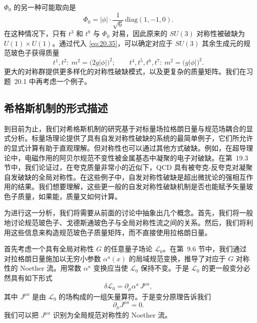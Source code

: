 $\Phi_0$ 的另一种可能取向是
\begin{equation}
  \Phi_0 = |\phi|\cdot\frac{1}{\sqrt{6}}\,
    \mathrm{diag}(1, -1, 0) .
  \label{eq:20.41}
\end{equation}
在这种情况下，只有 $t^3$ 和 $t^8$ 与 $\Phi_0$ 对易，因此原来的 $SU(3)$ 对称性被破缺为 $U(1)\times U(1)$。通过代入 \eqref{eq:20.35}，可以确定对应于 $SU(3)$ 其余生成元的规范玻色子获得质量
\begin{equation}
  t^1, t^2:\ m^2 = \bigl( 2g|\phi| \bigr)^2;\qquad
  t^4, t^5, t^6, t^7:\ m^2 = \bigl( g|\phi| \bigr)^2 .
  \label{eq:20.42}
\end{equation}
更大的对称群提供更多样化的对称性破缺模式，以及更复杂的质量矩阵。我们在习题~20.1 中再考虑一个例子。

\subsection{希格斯机制的形式描述}

到目前为止，我们对希格斯机制的研究基于对标量场拉格朗日量与规范场耦合的显式分析。标量场理论提供了具有自发对称性破缺的系统的最简单例子，它们所允许的显式计算有助于直观理解。但对称性也可以通过其他方式破缺。例如，在超导理论中，电磁作用的阿贝尔规范不变性被金属基态中凝聚的电子对破缺。在第~19.3 节中，我们论证过，在夸克质量非常小的近似下，QCD 具有被夸克-反夸克对凝聚自发破缺的全局对称性。在这些例子中，自发对称性破缺是超出微扰论的强相互作用的结果。我们想要理解，这些更一般的自发对称性破缺机制是否也能赋予矢量玻色子质量，如果能，质量又如何计算。

为进行这一分析，我们将需要从前面的讨论中抽象出几个概念。首先，我们将一般地讨论规范玻色子、戈德斯通玻色子与全局对称性流之间的关系。然后，我们将利用这些信息来构造规范玻色子质量矩阵，而不直接使用拉格朗日量。

首先考虑一个具有全局对称性 $G$ 的任意量子场论 $\mathcal{L}_0$。在第~9.6 节中，我们通过对拉格朗日量施加以无穷小参数 $\alpha^a(x)$ 的局域规范变换，推导了对应于 $G$ 对称性的 Noether 流。用常数 $\alpha^a$ 变换应当使 $\mathcal{L}_0$ 保持不变。于是 $\mathcal{L}_0$ 的更一般变分必然具有如下形式
\begin{equation}
  \delta\mathcal{L}_0 = \partial_\mu\alpha^a\,J^{\mu a} ,
  \label{eq:20.43}
\end{equation}
其中 $J^{\mu a}$ 是由 $\mathcal{L}_0$ 的场构成的一组矢量算符。于是变分原理告诉我们
\begin{equation}
  \partial_\mu J^{\mu a} = 0 .
  \label{eq:20.44}
\end{equation}
我们可以把 $J^{\mu a}$ 识别为全局规范对称性的 Noether 流。

